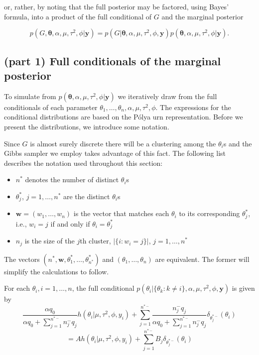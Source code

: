 \documentclass[12pt]{article}
\newcommand{\m}[1]{\mathbf{\bm{#1}}}
\begin{document}
\noindent or, rather, by noting that the full posterior may be factored, using Bayes' formula, into a product of the full conditional of $G$ and the marginal posterior

\[ p(G,\m{\theta},\alpha,\mu,\tau^2,\phi|\m{y}) = p(G|\m{\theta},\alpha,\mu,\tau^2,\phi,\m{y})p(\m{\theta},\alpha,\mu,\tau^2,\phi|\m{y}). \]

\subsection*{(part 1) Full conditionals of the marginal posterior}

\noindent To simulate from $p(\m{\theta},\alpha,\mu,\tau^2,\phi|\m{y})$ we iteratively draw from the full conditionals of each parameter $\theta_1,\ldots,\theta_n,\alpha,\mu,\tau^2,\phi$. The expressions for the conditional distributions are based on the P{\'o}lya urn representation. Before we present the distributions, we introduce some notation.

Since $G$ is almost surely discrete there will be a clustering among the $\theta_i$s and the Gibbs sampler we employ takes advantage of this fact. The following list describes the notation used throughout this section:
\begin{itemize}[label=$\cdot$]
\item $n^*$ denotes the number of distinct $\theta_i$s
\item $\theta_j^*$, $j=1,\ldots,n^*$ are the distinct $\theta_i$s
\item $\m{w}=(w_1,\ldots,w_n)$ is the vector that matches each $\theta_i$ to its corresponding $\theta_j^*$, i.e., $w_i=j$ if and only if $\theta_i=\theta_j^*$
\item $n_j$ is the size of the $j$th cluster, $|\{i:w_i=j\}|$, $j=1,\ldots,n^*$
\end{itemize}

\noindent The vectors $(n^*, \m{w}, \theta_1^*,\ldots,\theta_{n^*}^*)$ and $(\theta_1,\ldots,\theta_n)$ are equivalent. The former will simplify the calculations to follow.

For each $\theta_i, i=1,\ldots,n$, the full conditional $p(\theta_i|\{\theta_k:k\neq i\},\alpha,\mu,\tau^2,\phi,\m{y})$ is given by
\[ \frac{\alpha q_0}{\alpha q_0 + \sum_{j=1}^{n^{*-}} n_j^-q_j}h(\theta_i|\mu,\tau^2,\phi,y_i)+\sum_{j=1}^{n^{*-}}\frac{n_j^-q_j}{\alpha q_0 + \sum_{j=1}^{n^{*-}}n_j^-q_j}\delta_{\theta_j^{*-}}(\theta_i) \]
\[ =Ah(\theta_i|\mu,\tau^2,\phi,y_i)+\sum_{j=1}^{n^{*-}}B_j \delta_{\theta_j^{*-}}(\theta_i) \]
\end{document}
